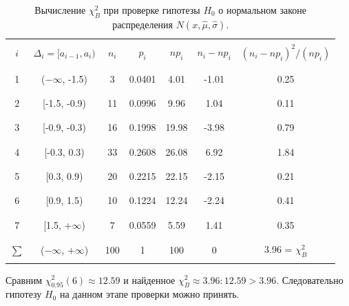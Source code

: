 \documentclass[../body.tex]{subfiles}
\begin{document}
		\begin{table}[H]
			\centering
			\begin{tabular}{| c | c | c | c | c | c | c |}
				\hline \hline
				&  &  &  &  &  & \\
				$i$   & $\Delta_i = [a_{i-1}, a_i)$   &   $n_i$ &   $p_i$ &   $np_i$ &   $n_i - np_i$ &   $(n_i - np_i)^2/(np_i)$ \\
				&  &  &  &  &  & \\
				\hline
				&  &  &  &  &  & \\
				1     & ($-\infty$, -1.5)           &       3 &  0.0401 &     4.01 &          -1.01 &                            0.25 \\ 
				&  &  &  &  &  & \\\hline &  &  &  &  &  & \\
				2     & [-1.5, -0.9)                &      11 &  0.0996 &     9.96 &           1.04 &                            0.11 \\ 
				&  &  &  &  &  & \\\hline &  &  &  &  &  & \\
				3     & [-0.9, -0.3)                &      16 &  0.1998 &    19.98 &          -3.98 &                            0.79 \\ 
				&  &  &  &  &  & \\\hline &  &  &  &  &  & \\
				4     & [-0.3, 0.3)                 &      33 &  0.2608 &    26.08 &           6.92 &                            1.84 \\ 
				&  &  &  &  &  & \\\hline &  &  &  &  &  & \\
				5     & [0.3, 0.9)                  &      20 &  0.2215 &    22.15 &          -2.15 &                            0.21 \\ 
				&  &  &  &  &  & \\\hline &  &  &  &  &  & \\
				6     & [0.9, 1.5)                  &      10 &  0.1224 &    12.24 &          -2.24 &                            0.41 \\ 
				&  &  &  &  &  & \\\hline &  &  &  &  &  & \\
				7     & [1.5, $+\infty$)             &       7 &  0.0559 &     5.59 &           1.41 &                            0.35 \\ 
				&  &  &  &  &  & \\\hline &  &  &  &  &  & \\
				$\sum$& ($-\infty$, $+\infty$)                           &     100 &  1      &   100    &           0    &                            3.96 = $\chi_B^2$ \\
				&  &  &  &  &  & \\\hline \hline
			\end{tabular}
			\caption{Вычисление $\chi_B^2$ при проверке гипотезы $H_0$ о нормальном законе распределения $N(x, \hat{\mu}, \hat{\sigma})$.}
			\label{chi2_normal}
		\end{table}
		Сравним $\chi_{0.95}^2(6) \approx 12.59$ и найденное  $\chi_B^2 \approx 3.96: 12.59 > 3.96.$ Следовательно гипотезу $H_0$ на данном этапе проверки можно принять.\\
\end{document}
